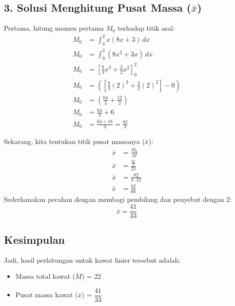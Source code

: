\documentclass[12pt,a4paper]{article}
\begin{document}
\subsection*{3. Solusi Menghitung Pusat Massa ($\bar{x}$)}
Pertama, hitung momen pertama $M_0$ terhadap titik asal:
\begin{align*}
  M_0 &= \int_{0}^{2} x(8x + 3) \, dx \\
  M_0 &= \int_{0}^{2} (8x^2 + 3x) \, dx \\
  M_0 &= \left[ \frac{8}{3}x^3 + \frac{3}{2}x^2 \right]_{0}^{2} \\
  M_0 &= \left( \left[ \frac{8}{3}(2)^3 + \frac{3}{2}(2)^2 \right] - 0 \right) \\
  M_0 &= \left( \frac{64}{3} + \frac{12}{2} \right) \\
  M_0 &= \frac{64}{3} + 6 \\
  M_0 &= \frac{64 + 18}{3} = \frac{82}{3}
\end{align*}

Sekarang, kita tentukan titik pusat massanya ($\bar{x}$):
\begin{align*}
  \bar{x} &= \frac{M_0}{M} \\
  \bar{x} &= \frac{\frac{82}{3}}{22} \\
  \bar{x} &= \frac{82}{3 \cdot 22} \\
  \bar{x} &= \frac{82}{66}
\end{align*}
Sederhanakan pecahan dengan membagi pembilang dan penyebut dengan 2:
\begin{equation*}
  \bar{x} = \frac{41}{33}
\end{equation*}

\subsection*{Kesimpulan}
Jadi, hasil perhitungan untuk kawat linier tersebut adalah:
\begin{itemize}
  \item Massa total kawat ($M$) = \textbf{$22$}
  \item Pusat massa kawat ($\bar{x}$) = \textbf{$\dfrac{41}{33}$}
\end{itemize}
\end{document}
